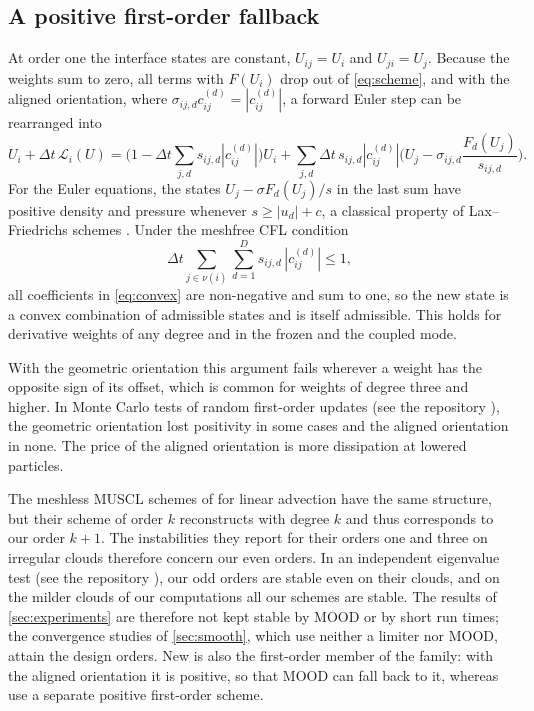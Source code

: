 \documentclass[smallextended]{svjour3}
\numberwithin{equation}{section}
\newcommand{\nb}{\nu}
\newcommand{\Lop}{\mathcal{L}}
\begin{document}
\subsection{A positive first-order fallback}\label{sec:positivity}

At order one the interface states are constant, $U_{ij}=U_i$ and $U_{ji}=U_j$. Because the weights sum to zero, all terms with $F(U_i)$ drop out of \eqref{eq:scheme}, and with the aligned orientation, where $\sigma_{ij,d}c^{(d)}_{ij}=|c^{(d)}_{ij}|$, a forward Euler step can be rearranged into
\begin{equation}\label{eq:convex}
U_i+\Delta t\,\Lop_i(U)=\Big(1-\Delta t\sum_{j,d}s_{ij,d}|c^{(d)}_{ij}|\Big)U_i+\sum_{j,d}\Delta t\,s_{ij,d}|c^{(d)}_{ij}|\Big(U_j-\sigma_{ij,d}\frac{F_d(U_j)}{s_{ij,d}}\Big).
\end{equation}
For the Euler equations, the states $U_j-\sigma F_d(U_j)/s$ in the last sum have positive density and pressure whenever $s\ge|u_d|+c$, a classical property of Lax--Friedrichs schemes \cite{PerthameShu1996,ZhangShu2010}. Under the meshfree CFL condition
\begin{equation}\label{eq:cflpos}
\Delta t\sum_{j\in\nb(i)}\sum_{d=1}^Ds_{ij,d}\,|c^{(d)}_{ij}|\le1,
\end{equation}
all coefficients in \eqref{eq:convex} are non-negative and sum to one, so the new state is a convex combination of admissible states and is itself admissible. This holds for derivative weights of any degree and in the frozen and the coupled mode.

\begin{remark}
With the geometric orientation this argument fails wherever a weight has the opposite sign of its offset, which is common for weights of degree three and higher. In Monte Carlo tests of random first-order updates (see the repository \cite{jung_supplementary}), the geometric orientation lost positivity in some cases and the aligned orientation in none. The price of the aligned orientation is more dissipation at lowered particles.
\end{remark}

\begin{remark}\label{rem:stability}
The meshless MUSCL schemes of \cite{Willems2025} for linear advection have the same structure, but their scheme of order $k$ reconstructs with degree $k$ and thus corresponds to our order $k+1$. The instabilities they report for their orders one and three on irregular clouds therefore concern our even orders. In an independent eigenvalue test (see the repository \cite{jung_supplementary}), our odd orders are stable even on their clouds, and on the milder clouds of our computations all our schemes are stable. The results of \cref{sec:experiments} are therefore not kept stable by MOOD or by short run times; the convergence studies of \cref{sec:smooth}, which use neither a limiter nor MOOD, attain the design orders. New is also the first-order member of the family: with the aligned orientation it is positive, so that MOOD can fall back to it, whereas \cite{Willems2025} use a separate positive first-order scheme.
\end{remark}
\end{document}
